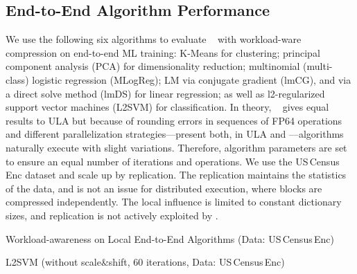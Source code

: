 \subsection{End-to-End Algorithm Performance}
\label{sec:end-to-end}

We use the following six algorithms to evaluate \name~ with workload-ware compression on end-to-end ML training:
K-Means for clustering;
principal component analysis (PCA) for dimensionality reduction;
multinomial (multi-class) logistic regression (MLogReg);
LM via conjugate gradient (lmCG), and via a direct solve method (lmDS) for linear regression;
as well as
l2-regularized support vector machines (L2SVM) for classification.
In theory, \name~ gives equal results to ULA but because of rounding errors in sequences of
FP64 operations and different parallelization strategies---present both, in ULA and \name---algorithms naturally execute with slight variations.
Therefore, algorithm parameters are set to ensure an equal number of iterations and operations.
We use the US\,Census\,Enc dataset and scale up by replication.
The replication maintains the statistics of the data,
and is not an issue for distributed execution, where blocks are compressed independently.
The local influence is limited to constant dictionary sizes, and replication is not actively exploited by \name.


\begin{table}[!t]
	\setlength\tabcolsep{10pt}
	\centering
	\caption{\label{tab:end2end}Workload-awareness on Local End-to-End Algorithms (Data: US\,Census\,Enc)}
	\vspace{-0.4cm}

	

\end{table}%

\begin{table}[!t]
	\centering
	\setlength\tabcolsep{10pt}
	\caption{\label{tab:expCLAEndToEnd}L2SVM (without scale\&shift, 60 iterations, Data: US\,Census\,Enc)}
	\vspace{-0.4cm}

	

\end{table}%

